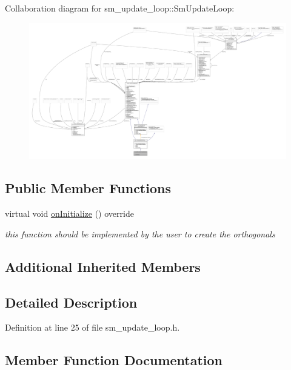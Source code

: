 Collaboration diagram for sm\+\_\+update\+\_\+loop\+:\+:Sm\+Update\+Loop\+:
\nopagebreak
\begin{figure}[H]
\begin{center}
\leavevmode
\includegraphics[width=350pt]{structsm__update__loop_1_1SmUpdateLoop__coll__graph}
\end{center}
\end{figure}
\subsection*{Public Member Functions}
\begin{DoxyCompactItemize}
\item 
virtual void \hyperlink{structsm__update__loop_1_1SmUpdateLoop_a7434ac83f9a7a1732b5814cb307522a6}{on\+Initialize} () override
\begin{DoxyCompactList}\small\item\em this function should be implemented by the user to create the orthogonals \end{DoxyCompactList}\end{DoxyCompactItemize}
\subsection*{Additional Inherited Members}


\subsection{Detailed Description}


Definition at line 25 of file sm\+\_\+update\+\_\+loop.\+h.



\subsection{Member Function Documentation}
